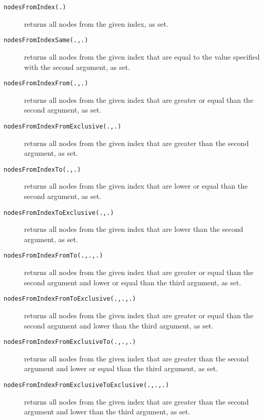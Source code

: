 \begin{description}
\item[\texttt{nodesFromIndex(.)}] returns all nodes from the given index, as set.
\item[\texttt{nodesFromIndexSame(.,.)}] returns all nodes from the given index that are equal to the value specified with the second argument, as set.
\item[\texttt{nodesFromIndexFrom(.,.)}] returns all nodes from the given index that are greater or equal than the second argument, as set.
\item[\texttt{nodesFromIndexFromExclusive(.,.)}] returns all nodes from the given index that are greater than the second argument, as set.
\item[\texttt{nodesFromIndexTo(.,.)}] returns all nodes from the given index that are lower or equal than the second argument, as set.
\item[\texttt{nodesFromIndexToExclusive(.,.)}] returns all nodes from the given index that are lower than the second argument, as set.
\item[\texttt{nodesFromIndexFromTo(.,.,.)}] returns all nodes from the given index that are greater or equal than the second argument and lower or equal than the third argument, as set.
\item[\texttt{nodesFromIndexFromToExclusive(.,.,.)}] returns all nodes from the given index that are greater or equal than the second argument and lower than the third argument, as set.
\item[\texttt{nodesFromIndexFromExclusiveTo(.,.,.)}] returns all nodes from the given index that are greater than the second argument and lower or equal than the third argument, as set.
\item[\texttt{nodesFromIndexFromExclusiveToExclusive(.,.,.)}] returns all nodes from the given index that are greater than the second argument and lower than the third argument, as set.
\end{description}

